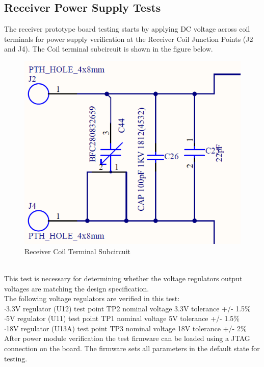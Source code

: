 \documentclass[12pt]{article}
\begin{document}
\subsection{Receiver Power Supply Tests}
\indent \indent
The receiver prototype board testing starts by applying DC voltage across coil terminals for power supply verification at the Receiver Coil Junction Points (J2 and J4).  The Coil terminal subcircuit is shown in the figure below.
\hfill
\begin{figure}[h!]
\centering
\includegraphics[width=0.75\linewidth]{RX_COIL_TERMINALS}
\caption{Receiver Coil Terminal Subcircuit}
\end{figure}
\hfill \\
\indent
This test is necessary for determining whether the voltage regulators output voltages are matching the design specification.\\

\noindent
The following voltage regulators are verified in this test:\\
\indent \indent $\cdot$3.3V regulator (U12) test point TP2 nominal voltage 3.3V  tolerance +/- 1.5\%\\
\indent \indent $\cdot$5V regulator (U11) test point TP1 nominal voltage 5V  tolerance +/- 1.5\%\\
\indent \indent $\cdot$18V regulator (U13A) test point TP3 nominal voltage 18V tolerance +/- 2\%\\

\noindent
After power module verification the test firmware can be loaded using a JTAG connection on the board.  The firmware sets all parameters in the default state for testing.

\hfill \\
\pagebreak
\end{document}
